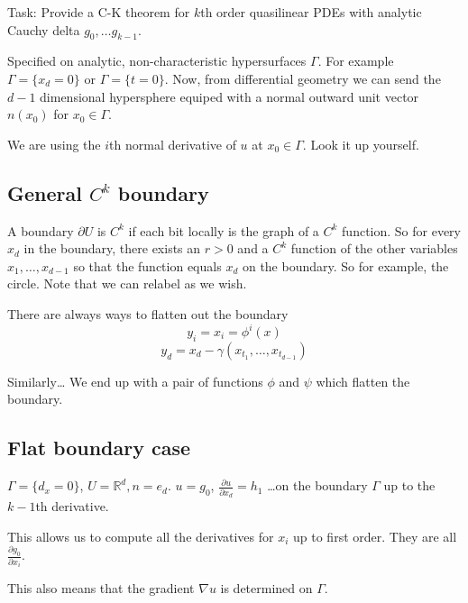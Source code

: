 \documentclass{article}
\numberwithin{equation}{section}
\theoremstyle{definition}
\newcommand{\R}{\mathbb{R}}
\newcommand{\pp}[2]{\frac{\partial #1}{\partial #2}}
\newcommand{\set}[1]{\{#1\}}
\begin{document}




Task: Provide a C-K theorem for $k$th order quasilinear PDEs with analytic Cauchy delta $g_0,\dots g_{k-1}$.

Specified on analytic, non-characteristic hypersurfaces $\Gamma$. For example $\Gamma = \set{x_d = 0}$ or $\Gamma = \set{t=0}$.
Now, from differential geometry we can send the $d-1$ dimensional hypersphere equiped with a normal outward unit vector $n(x_0)$ for $x_0 \in \Gamma$.

We are using the $i$th normal derivative of $u$ at $x_0 \in \Gamma$. Look it up yourself.

\subsection{General $C^k$ boundary}
A boundary $\partial U$ is $C^k$ if each bit locally is the graph of a $C^k$ function.
So for every $x_d$ in the boundary, there exists an $r>0$ and a $C^k$ function of the other variables $x_1, \dots, x_{d-1}$ so that the function equals $x_d$ on the boundary. So for example, the circle.
Note that we can relabel as we wish.

There are always ways to flatten out the boundary \begin{equation}
    y_i = x_i = \phi^i(x)
\end{equation}
\begin{equation}
    y_d = x_d - \gamma(x_{t_1},\dots,x_{t_{d-1}})    
\end{equation}

Similarly\dots
We end up with a pair of functions $\phi$ and $\psi$ which flatten the boundary.


\subsection{Flat boundary case}
$\Gamma = \set{d_x= 0 }$, $U = \R^d, n = e_d$.
$u = g_0$, $\pp{u}{x_d} = h_1$ \dots on the boundary $\Gamma$ up to the $k-1$th derivative.

This allows us to compute all the derivatives for $x_i$ up to first order. They are all $\pp{g_0}{x_i}$.

This also means that the gradient $\nabla u$ is determined on $\Gamma$.
\end{document}

